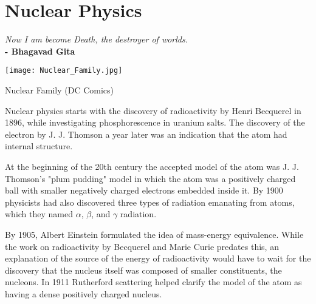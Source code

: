 \chapter{Nuclear Physics}

\textit{Now I am become Death, the destroyer of worlds.}\\
\noindent\textbf{-    Bhagavad Gita}

\vspace{0.5cm}

\begin{marginfigure}[-10pt]
  \texttt{[image: Nuclear\_Family.jpg]}
  \caption{Nuclear Family (DC Comics)}
  \label{fig:fig}
\end{marginfigure}

\vspace{0.5cm}

Nuclear physics starts with the discovery of radioactivity by Henri Becquerel in 1896, while investigating phosphorescence in uranium salts. The discovery of the electron by J. J. Thomson a year later was an indication that the atom had internal structure. 

At the beginning of the 20th century the accepted model of the atom was J. J. Thomson's "plum pudding" model in which the atom was a positively charged ball with smaller negatively charged electrons embedded inside it.  By 1900 physicists had also discovered three types of radiation emanating from atoms, which they named $\alpha$, $\beta$, and $\gamma$ radiation.  

By 1905, Albert Einstein formulated the idea of mass-energy equivalence. While the work on radioactivity by Becquerel and Marie Curie predates this, an explanation of the source of the energy of radioactivity would have to wait for the discovery that the nucleus itself was composed of smaller constituents, the nucleons.  In 1911 Rutherford scattering helped clarify the model of the atom as having a dense positively charged nucleus.
\vspace{0.5cm}

